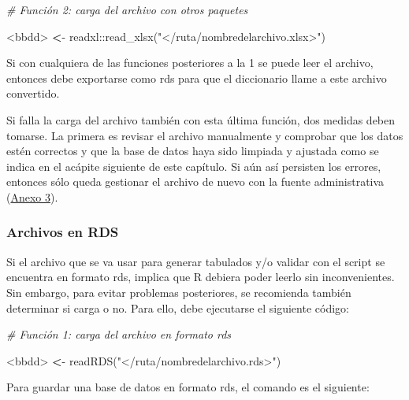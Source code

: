 \documentclass[
  spanish,
]{book}
\newenvironment{Shaded}{\begin{snugshade}}{\end{snugshade}}
\newcommand{\CommentTok}[1]{\textcolor[rgb]{0.56,0.35,0.01}{\textit{#1}}}
\newcommand{\ErrorTok}[1]{\textcolor[rgb]{0.64,0.00,0.00}{\textbf{#1}}}
\newcommand{\FunctionTok}[1]{\textcolor[rgb]{0.00,0.00,0.00}{#1}}
\newcommand{\NormalTok}[1]{#1}
\newcommand{\SpecialCharTok}[1]{\textcolor[rgb]{0.00,0.00,0.00}{#1}}
\newcommand{\StringTok}[1]{\textcolor[rgb]{0.31,0.60,0.02}{#1}}
\begin{document}
\begin{Shaded}
\begin{Highlighting}[]
\CommentTok{\# Función 2: carga del archivo con otros paquetes}

\SpecialCharTok{\textless{}}\NormalTok{bbdd}\SpecialCharTok{\textgreater{}} \ErrorTok{\textless{}}\SpecialCharTok{{-}}\NormalTok{ readxl}\SpecialCharTok{::}\FunctionTok{read\_xlsx}\NormalTok{(}\StringTok{"\textless{}/ruta/nombredelarchivo.xlsx\textgreater{}"}\NormalTok{)}
\end{Highlighting}
\end{Shaded}

Si con cualquiera de las funciones posteriores a la 1 se puede leer el archivo, entonces debe exportarse como rds para que el diccionario llame a este archivo convertido.

Si falla la carga del archivo también con esta última función, dos medidas deben tomarse. La primera es revisar el archivo manualmente y comprobar que los datos estén correctos y que la base de datos haya sido limpiada y ajustada como se indica en el acápite siguiente de este capítulo. Si aún así persisten los errores, entonces sólo queda gestionar el archivo de nuevo con la fuente administrativa (\protect\hyperlink{anexo3}{Anexo 3}).

\hypertarget{rds}{%
\subsubsection{Archivos en RDS}\label{rds}}

Si el archivo que se va usar para generar tabulados y/o validar con el script se encuentra en formato rds, implica que R debiera poder leerlo sin inconvenientes. Sin embargo, para evitar problemas posteriores, se recomienda también determinar si carga o no. Para ello, debe ejecutarse el siguiente código:

\begin{Shaded}
\begin{Highlighting}[]
\CommentTok{\# Función 1: carga del archivo en formato rds }

\SpecialCharTok{\textless{}}\NormalTok{bbdd}\SpecialCharTok{\textgreater{}} \ErrorTok{\textless{}}\SpecialCharTok{{-}} \FunctionTok{readRDS}\NormalTok{(}\StringTok{"\textless{}/ruta/nombredelarchivo.rds\textgreater{}"}\NormalTok{)}
\end{Highlighting}
\end{Shaded}

Para guardar una base de datos en formato rds, el comando es el siguiente:
\end{document}
